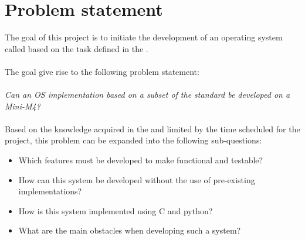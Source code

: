 \chapter{Problem statement}


The goal of this project is to initiate the development of an \arinc{}
operating system called \OSname{} based on the task defined in the
.
\\\\
The goal give rise to the following problem statement:
\\\\
\textit{Can an OS implementation based on a subset of the \arinc{} standard be
developed on a Mini-M4?}
\\\\
Based on the knowledge acquired in the 
and limited by the time scheduled for the project, this problem can be expanded
into the following sub-questions:

\begin{itemize}
	\item Which features must be developed to make \OSname{} functional and testable?
	\item How can this system be developed without the use of pre-existing
		implementations?
	\item How is this system implemented using C and python?
	\item What are the main obstacles when developing such a system?
\end{itemize}
